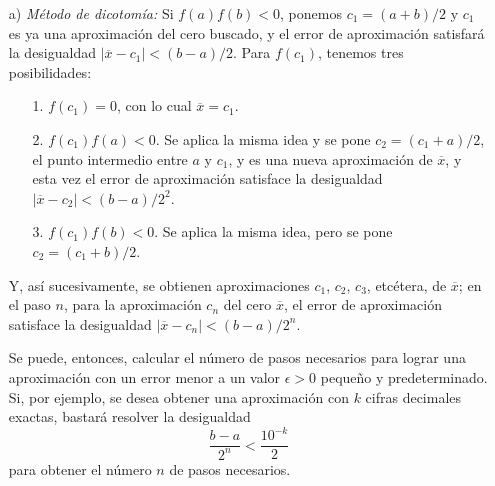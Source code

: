 \begin{enumerate}
\item [a)]\textit{Método de dicotomía:} Si $f(a)f(b) < 0$, ponemos $c_1 = (a + b)/2$ y $c_1$ es ya una aproximación del cero buscado, y el error de aproximación satisfará la desigualdad
$|\overline{x} - c_1| < (b - a)/2$. Para $f(c_1)$, tenemos tres posibilidades:
\begin{enumerate}
\item [1.]$f(c_1) = 0$, con lo cual $\overline{x} = c_1$.
\item [2.]$f(c_1)f(a) < 0$. Se aplica la misma idea y se pone $c_2 = (c_1 + a)/2$, el punto intermedio entre $a$ y $c_1$, y es una nueva aproximación de $\overline{x}$, y esta vez el error de aproximación satisface la desigualdad $|\overline{x} - c_2| < (b - a)/2^2$.
\item [3.] $f(c_1)f(b) < 0$. Se aplica la misma idea, pero se pone $c_2 = (c_1 + b)/2$.
\end{enumerate}
Y, así sucesivamente, se obtienen aproximaciones $c_1$, $c_2$, $c_3$, etcétera, de $\overline{x}$; en el paso $n$, para la aproximación $c_n$ del cero $\overline{x}$, el error de aproximación satisface la desigualdad $|\overline x - c_n| < (b - a)/2^n$.

Se puede, entonces, calcular el número de pasos necesarios para lograr una aproximación con un error menor a un valor $\epsilon > 0$ pequeño y predeterminado. Si, por ejemplo, se desea obtener una aproximación con $k$ cifras decimales exactas, bastará resolver la desigualdad
\begin{equation}
\label{eq:dc001}
\frac{b - a}{2^n} < \frac{10^{-k}}{2}
\end{equation}
para obtener el número $n$ de pasos necesarios.


\end{enumerate}
